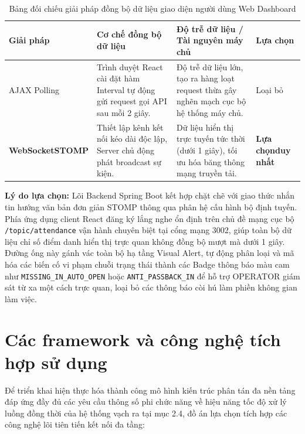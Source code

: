 ﻿\documentclass[../DoAn.tex]{subfiles}
\begin{document}
\begin{table}[ht!]
\centering
\small
\renewcommand{\arraystretch}{1.3}
\caption{Bảng đối chiếu giải pháp đồng bộ dữ liệu giao diện người dùng Web Dashboard}
\label{tab:websocket_comparison}
\begin{tabular}{|>{\raggedright\arraybackslash}p{2.3cm}|>{\raggedright\arraybackslash}p{4.5cm}|>{\raggedright\arraybackslash}p{5.5cm}|>{\centering\arraybackslash}p{1.7cm}|}
\hline
\textbf{Giải pháp} & \textbf{Cơ chế đồng bộ dữ liệu} & \textbf{Độ trễ dữ liệu / Tài nguyên máy chủ} & \textbf{Lựa chọn} \\ \hline
AJAX Polling & Trình duyệt React cài đặt hàm Interval tự động gửi request gọi API sau mỗi 2 giây. & Độ trễ dữ liệu lớn, tạo ra hàng loạt request thừa gây nghẽn mạch cục bộ hệ thống máy chủ. & Loại bỏ \\ \hline
\textbf{WebSocket\newline STOMP} & Thiết lập kênh kết nối kéo dài độc lập, Server chủ động phát broadcast sự kiện. & Dữ liệu hiển thị trực tuyến tức thời (dưới 1 giây), tối ưu hóa băng thông mạng truyền tải. & \textbf{Lựa chọn\newline duy nhất} \\ \hline
\end{tabular}
\end{table}

\textbf{Lý do lựa chọn:} Lõi Backend Spring Boot kết hợp chặt chẽ với giao thức nhắn tin hướng văn bản đơn giản STOMP thông qua phân hệ cấu hình bộ định tuyến. Phía ứng dụng client React đăng ký lắng nghe ổn định trên chủ đề mạng cục bộ \texttt{/topic/attendance} vận hành chuyên biệt tại cổng mạng 3002, giúp toàn bộ dữ liệu chỉ số điểm danh hiển thị trực quan không đồng bộ mượt mà dưới 1 giây. Đường ống này gánh vác toàn bộ hạ tầng Visual Alert, tự động phân loại và mã hóa các biến cố vi phạm chuỗi trạng thái thành các Badge thông báo màu cam như \texttt{MISSING\_IN\_AUTO\_OPEN} hoặc \texttt{ANTI\_PASSBACK\_IN} để hỗ trợ OPERATOR giám sát từ xa một cách trực quan, loại bỏ các thông báo còi hú làm phiền không gian làm việc.

\clearpage

\section{Các framework và công nghệ tích hợp sử dụng}
\label{section:3.7}

Để triển khai hiện thực hóa thành công mô hình kiến trúc phân tán đa nền tảng đáp ứng đầy đủ các yêu cầu thông số phi chức năng về hiệu năng tốc độ xử lý luồng đồng thời của hệ thống vạch ra tại mục 2.4, đồ án lựa chọn tích hợp các công nghệ lõi tiên tiến kết nối đa tầng:
\end{document}
